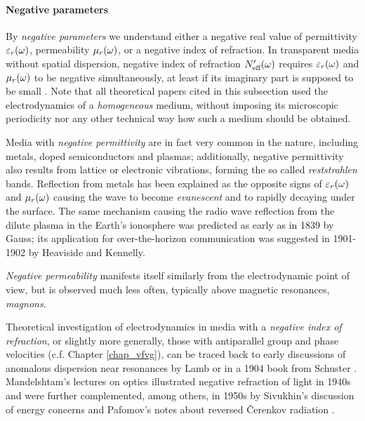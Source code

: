 \paragraph{Negative parameters}%
By \textit{negative parameters} we  understand either a negative real value of permittivity $\varepsilon_r(\omega)$, permeability $\mu_r(\omega)$, 
or a negative index of refraction. In transparent media without spatial dispersion, negative index of refraction $N_{\text{eff} }'(\omega)$ requires $\varepsilon_r(\omega)$ and $\mu_r(\omega)$ to be negative simultaneously, at least if its imaginary part is supposed to be small \cite{pazoutova2011dp}.  %
Note that all theoretical papers cited in this subsection used the electrodynamics of a \textit{homogeneous} medium, without imposing its microscopic periodicity nor any other technical way how such a medium should be obtained. 

Media with \textit{negative permittivity} are in fact very common in the nature, including metals, doped semiconductors and plasmas; additionally, negative permittivity also results from lattice or electronic vibrations, forming the so called \textit{reststrahlen} bands. Reflection from metals has been explained  %
as the opposite signs of $\varepsilon_r(\omega)$ and $\mu_r(\omega)$ causing the wave to become \textit{evanescent} and to rapidly decaying under the surface. %
The same mechanism causing the radio wave reflection from the dilute plasma in the Earth's ionosphere was predicted as early as in 1839 by Gauss; its application for over-the-horizon communication was suggested in 1901-1902 by Heaviside and Kennelly.

\textit{Negative permeability} manifests itself similarly from the electrodynamic point of view, but is observed much less often, typically above magnetic resonances, \textit{magnons}.

Theoretical investigation of electrodynamics in media with a \textit{negative index of refraction}, or slightly more generally, those with antiparallel group and phase velocities (c.f. Chapter \ref{chap_vfvg}), can be traced back \cite{agranovich2006spatial} to early discussions of anomalous dispersion near resonances by Lamb or in a 1904 book from Schuster \cite{schuster1904introduction, boardman2005negative}. Mandelshtam's lectures on optics illustrated negative refraction of light in 1940s \cite{mandelstam1971lectures} and were further complemented, among others, in 1950s by Sivukhin's discussion of energy concerns \cite{sivukhin1957energy} and Pafomov's notes about reversed \v{C}erenkov radiation \cite{pafomov1956cerenkov}. 

